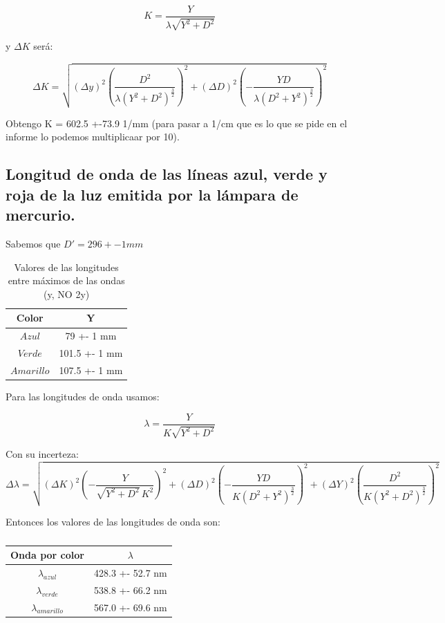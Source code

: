 \documentclass[12pt, a4paper]{article}
\begin{document}
\begin{equation}
  K = \frac{Y}{{\lambda} \sqrt{Y^{2} + D^{2}}}
\label{equation5}
\end{equation} 

y ${\Delta}K$ será:

\begin{equation}
  {\Delta}K = \sqrt{({\Delta}y)^2(\frac{D^{2}}{{\lambda} \left(Y^{2} + D^{2}\right)^{\frac{3}{2}}})^2+({\Delta}D)^2(-\frac{YD}{{\lambda} \left(D^{2} + Y^{2}\right)^{\frac{3}{2}}})^2}
\label{equation5}
\end{equation}

Obtengo K = 602.5 +-73.9 1/mm (para pasar a 1/cm que es lo que se pide en el informe lo podemos multiplicaar por 10).

\subsection{ Longitud de onda de las líneas azul, verde y roja de la luz emitida por la lámpara de mercurio.}
Sabemos que $D' = 296 +- 1 mm $ 
\begin{table}[H]
  \centering
  \begin{tabular}{|c|c|}
  \hline
  Color & Y \\
  \hline
  $Azul$  & 79 +- 1 mm  \\ \hline
  $Verde$  & 101.5 +- 1 mm \\ \hline
  $Amarillo$  & 107.5 +- 1 mm \\ \hline
  \end{tabular}
  \caption{\centering Valores de las longitudes entre máximos de las ondas (y, NO 2y)}
  \label{tabla1}
\end{table}

Para las longitudes de onda usamos:


\begin{equation}
  {\lambda} = \frac{Y}{K \sqrt{Y^{2} + D^{2}}}
\label{equation5}
\end{equation}

Con su incerteza:
\begin{equation}
  {\Delta}{\lambda} = \sqrt{({\Delta}K)^2(-\frac{Y}{\sqrt{Y^{2} + 
  D^{2}} \, K^{2}})^2 + ({\Delta}D)^2(-\frac{YD}{K \left(D^{2} + Y^{2}\right)^{\frac{3}{2}}})^2+ ({\Delta}Y)^2(\frac{D^{2}}{K \left(Y^{2} + D^{2}\right)^{\frac{3}{2}}})^2}
\label{equation5}
\end{equation}

Entonces los valores de las longitudes de onda son:
\begin{table}[H]
  \centering
  \begin{tabular}{|c|c|}
  \hline
  Onda por color & ${\lambda}$ \\
  \hline
  ${\lambda_{azul}}$  & 428.3 +- 52.7 nm  \\ \hline
  ${\lambda_{verde}}$  & 538.8 +- 66.2 nm \\ \hline
  ${\lambda_{amarillo}}$  & 567.0 +- 69.6 nm \\ \hline
  \end{tabular}
  \caption{\centering }
  \label{tabla2}
\end{table}
\end{document}
